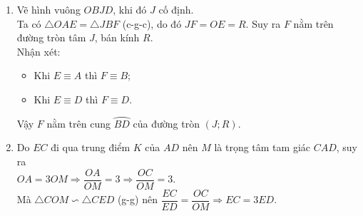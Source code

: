 \begin{bt}
{\begin{enumerate}
			Vậy khi $ E $ ở vị trí điểm $ D $ thì $ CM\cdot EM $ có giá trị lớn nhất.
			\item Vẽ hình vuông $ OBJD $, khi đó $ J $ cố định.\\
			Ta có $ \triangle OAE=\triangle JBF $ (c-g-c), do đó $ JF=OE=R $. Suy ra $ F $ nằm trên đường tròn tâm $ J $, bán kính $ R $.\\
			Nhận xét:
			\begin{itemize}
				\item Khi $ E\equiv A $ thì $ F\equiv B $;
				\item Khi $ E\equiv D $ thì $ F\equiv D $.
			\end{itemize}
			Vậy $ F $ nằm trên cung $ \wideparen{BD} $ của đường tròn $ (J;R) $.
			\item Do $ EC $ đi qua trung điểm $ K $ của $ AD $ nên $ M $ là trọng tâm tam giác $ CAD$, suy ra\\
			$ OA=3OM\Rightarrow\dfrac{OA}{OM}=3\Rightarrow \dfrac{OC}{OM}=3 $.\\
			Mà $ \triangle COM\backsim \triangle CED $ (g-g) nên $ \dfrac{EC}{ED}=\dfrac{OC}{OM}\Rightarrow EC=3ED $.
		\end{enumerate}
	}
\end{bt}
